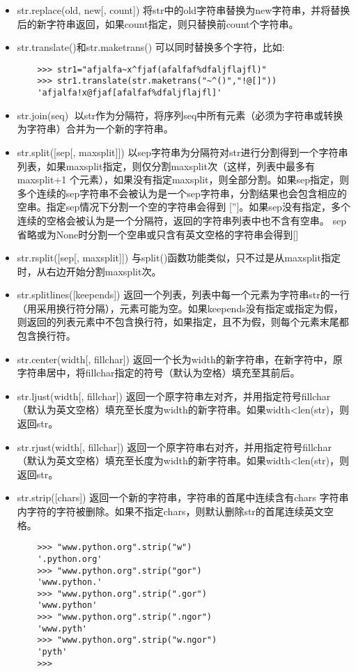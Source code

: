 \documentclass[twoside,11pt]{book}
\begin{document}
\begin{itemize}
  \item str.replace(old, new[, count]) 将str中的old字符串替换为new字符串，并将替换后的新字符串返回，如果count指定，则只替换前count个字符串。
  \item str.translate()和str.maketrans() 可以同时替换多个字符，比如:
  \begin{lstlisting}
    >>> str1="afjalfa~x^fjaf(afalfaf%dfaljflajfl)"
    >>> str1.translate(str.maketrans("~^()","!@[]"))
    'afjalfa!x@fjaf[afalfaf%dfaljflajfl]'
  \end{lstlisting}
  \item str.join(seq) 以str作为分隔符，将序列seq中所有元素（必须为字符串或转换为字符串）合并为一个新的字符串。
  \item str.split([sep[, maxsplit]]) 以sep字符串为分隔符对str进行分割得到一个字符串列表，如果maxsplit指定，则仅分割maxsplit次（这样，列表中最多有maxsplit+1 个元素），如果没有指定maxsplit，则全部分割。如果sep指定，则多个连续的sep字符串不会被认为是一个sep字符串，分割结果也会包含相应的空串。指定sep情况下分割一个空的字符串会得到 ['']。如果sep没有指定，多个连续的空格会被认为是一个分隔符，返回的字符串列表中也不含有空串。 sep省略或为None时分割一个空串或只含有英文空格的字符串会得到[]
  \item str.rsplit([sep[, maxsplit]]) 与split()函数功能类似，只不过是从maxsplit指定时，从右边开始分割maxsplit次。
  \item str.splitlines([keepends]) 返回一个列表，列表中每一个元素为字符串str的一行（用采用换行符分隔），元素可能为空。如果keepends没有指定或指定为假，则返回的列表元素中不包含换行符，如果指定，且不为假，则每个元素末尾都包含换行符。

  \item str.center(width[, fillchar]) 返回一个长为width的新字符串，在新字符中，原字符串居中，将fillchar指定的符号（默认为空格）填充至其前后。
  \item str.ljust(width[, fillchar]) 返回一个原字符串左对齐，并用指定符号fillchar （默认为英文空格）填充至长度为width的新字符串。如果width<len(str)，则返回str。
  \item str.rjust(width[, fillchar]) 返回一个原字符串右对齐，并用指定符号fillchar （默认为英文空格）填充至长度为width的新字符串。如果width<len(str)，则返回str。
  \item str.strip([chars]) 返回一个新的字符串，字符串的首尾中连续含有chars 字符串内字符的字符被删除。如果不指定chars，则默认删除str的首尾连续英文空格。
  \begin{lstlisting}
    >>> "www.python.org".strip("w")
    '.python.org'
    >>> "www.python.org".strip("gor")
    'www.python.'
    >>> "www.python.org".strip(".gor")
    'www.python'
    >>> "www.python.org".strip(".ngor")
    'www.pyth'
    >>> "www.python.org".strip("w.ngor")
    'pyth'
    >>>
  \end{lstlisting}


\end{itemize}
\end{document}
